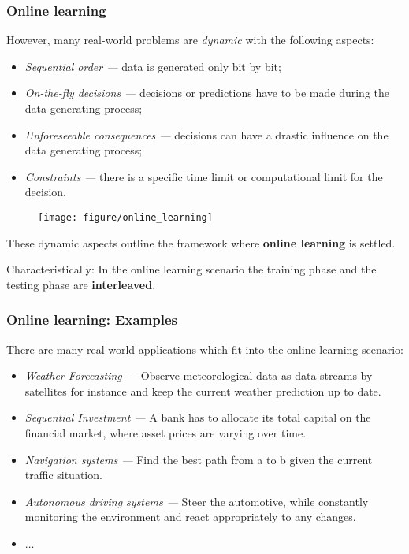 \documentclass[11pt,compress,t,notes=noshow, xcolor=table]{beamer}
\begin{document}
\begin{frame}[t]
	\frametitle{Online learning}
%	
\begin{itemize} \small
%	
  	\item However, many real-world problems are \emph{dynamic} with the following aspects:
	\lz
	
	\begin{minipage}{.6\textwidth}
	\begin{itemize} \small
		\item \emph{Sequential order ---} data is generated only bit by bit;
		\item \emph{On-the-fly decisions ---} decisions or predictions have to be made during the data generating process;
		\item \emph{Unforeseeable consequences ---} decisions can have a drastic influence on the data generating process;
		\item \emph{Constraints ---} there is a specific time limit or computational limit for the decision.
	\end{itemize}
	\end{minipage}
	\begin{minipage}{.3\textwidth}
		\begin{figure}
		\centering
		\texttt{[image: figure/online\_learning]}
		\end{figure}
	\end{minipage}
	\lz
	{ {	\item These dynamic aspects outline the framework where \textbf{online learning} is settled. 
	\item Characteristically: In the online learning scenario the training phase and the testing phase are \textbf{interleaved}.}}
	\end{itemize}
%	
\end{frame}


\begin{frame}
	\frametitle{Online learning: Examples}
	\small
	There are many real-world applications which fit into the online learning scenario:
	\begin{itemize} \small
		  \item \emph{Weather Forecasting ---} Observe meteorological data as data streams by satellites for instance and keep the current weather prediction up to date.
		  \item \emph{Sequential Investment ---} A bank has to allocate its total capital on the financial market, where asset prices are varying over time.
		  \item \emph{Navigation systems ---} Find the best path from a to b given the current traffic situation.
		  \item \emph{Autonomous driving systems ---} Steer the automotive, while constantly monitoring the environment and react appropriately to any changes.
		  \item $\ldots$
%		  
	\end{itemize}
\end{frame}
\end{document}
